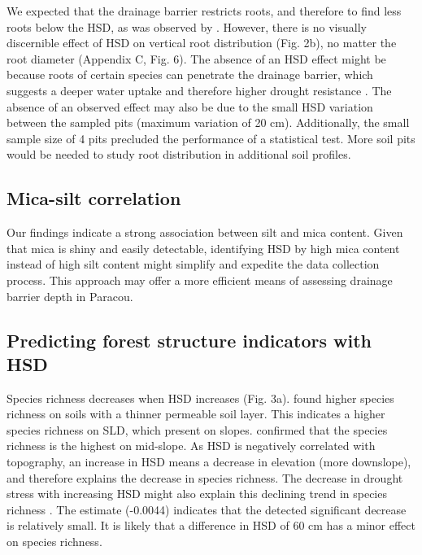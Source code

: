 \documentclass[fleqn,12pt]{latex/stylish_article} %
\begin{document}
We expected that the drainage barrier restricts roots, and therefore to find less roots below the HSD, as was observed by \citet{humbelCaracterisationParMesures1978}. However, there is no visually discernible effect of HSD on vertical root distribution (Fig. 2b), no matter the root diameter (Appendix C, Fig. 6). The absence of an HSD effect might be because roots of certain species can penetrate the drainage barrier, which suggests a deeper water uptake and therefore higher drought resistance \citep{ferryGeneseFonctionnementHydrique2003}. The absence of an observed effect may also be due to the small HSD variation between the sampled pits (maximum variation of 20 cm). Additionally, the small sample size of 4 pits precluded the performance of a statistical test. More soil pits would be needed to study root distribution in additional soil profiles.

\hypertarget{mica-silt-correlation}{%
\subsection{Mica-silt correlation}\label{mica-silt-correlation}}

Our findings indicate a strong association between silt and mica content. Given that mica is shiny and easily detectable, identifying HSD by high mica content instead of high silt content might simplify and expedite the data collection process. This approach may offer a more efficient means of assessing drainage barrier depth in Paracou.

\hypertarget{predicting-forest-structure-indicators-with-hsd}{%
\subsection{Predicting forest structure indicators with HSD}\label{predicting-forest-structure-indicators-with-hsd}}

Species richness decreases when HSD increases (Fig. 3a). \citet{sabatierInfluenceSoilCover1997} found higher species richness on soils with a thinner permeable soil layer. This indicates a higher species richness on SLD, which present on slopes. \citet{alliePervasiveLocalScaleTreeSoil2015} confirmed that the species richness is the highest on mid-slope. As HSD is negatively correlated with topography, an increase in HSD means a decrease in elevation (more downslope), and therefore explains the decrease in species richness. The decrease in drought stress with increasing HSD might also explain this declining trend in species richness \citep{sabatierInfluenceSoilCover1997}. The estimate (-0.0044) indicates that the detected significant decrease is relatively small. It is likely that a difference in HSD of 60 cm has a minor effect on species richness.
\end{document}
